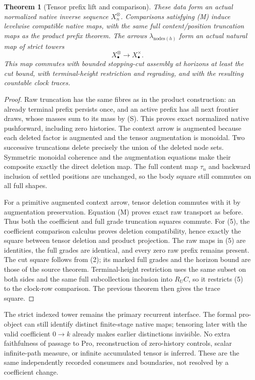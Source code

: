 \documentclass[11pt]{article}
\newtheorem{theorem}{Theorem}\newtheorem{proposition}[theorem]{Proposition}
\begin{document}
\begin{theorem}[Tensor prefix lift and comparison]
These data form an actual normalized native inverse sequence $X_n^\otimes$. Comparisons satisfying (M) induce levelwise compatible native maps, with the same full content/position truncation maps as the product prefix theorem. The arrows $\lambda_{\mathrm{nodes}(h)}$ form an actual natural map of strict towers
\[
 X_\bullet^\otimes\longrightarrow X_\bullet^\times.          \tag{5}
\]
This map commutes with bounded stopping-cut assembly at horizons at least the cut bound, with terminal-height restriction and regrading, and with the resulting countable clock traces.
\end{theorem}
\begin{proof}
Raw truncation has the same fibres as in the product construction: an already terminal prefix persists once, and an active prefix has all next frontier draws, whose masses sum to its mass by (S). This proves exact normalized native pushforward, including zero histories. The context arrow is augmented because each deleted factor is augmented and the tensor augmentation is monoidal. Two successive truncations delete precisely the union of the deleted node sets. Symmetric monoidal coherence and the augmentation equations make their composite exactly the direct deletion map. The full content map $\tau_n$ and backward inclusion of settled positions are unchanged, so the body square still commutes on all full shapes.

For a primitive augmented context arrow, tensor deletion commutes with it by augmentation preservation. Equation (M) proves exact raw transport as before. Thus both the coefficient and full grade truncation squares commute. For (5), the coefficient comparison calculus proves deletion compatibility, hence exactly the square between tensor deletion and product projection. The raw maps in (5) are identities, the full grades are identical, and every zero raw prefix remains present. The cut square follows from (2); its marked full grades and the horizon bound are those of the source theorem. Terminal-height restriction uses the same subset on both sides and the same full subcollection inclusion into $R_UC$, so it restricts (5) to the clock-row comparison. The previous theorem then gives the trace square.
\end{proof}

The strict indexed tower remains the primary recurrent interface. The formal pro-object can still identify distinct finite-stage native maps; tensoring later with the valid coefficient $0\to k$ already makes earlier distinctions invisible. No extra faithfulness of passage to Pro, reconstruction of zero-history controls, scalar infinite-path measure, or infinite accumulated tensor is inferred. These are the same independently recorded consumers and boundaries, not resolved by a coefficient change.
\end{document}
